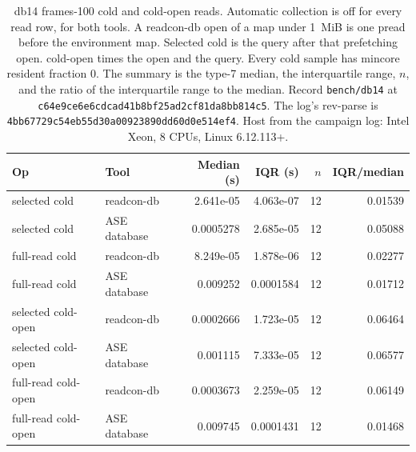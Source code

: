 \begin{table}[tbp]
\centering
\scriptsize
\caption{db14 frames-100 cold and cold-open reads.
Automatic collection is off for every read row, for both tools.
A readcon-db open of a map under 1~MiB is one pread before the environment map.
Selected cold is the query after that prefetching open.
cold-open times the open and the query.
Every cold sample has mincore resident fraction 0.
The summary is the type-7 median, the interquartile range, $n$, and the ratio of the interquartile range to the median.
Record \texttt{bench/db14} at \texttt{c64e9ce6e6cdcad41b8bf25ad2cf81da8bb814c5}.
The log's rev-parse is \texttt{4bb67729c54eb55d30a00923890dd60d0e514ef4}.
Host from the campaign log: Intel Xeon, 8 CPUs, Linux 6.12.113+.}
\label{tab:db14}
\begin{tabular}{@{}llrrrr@{}}
\toprule
Op & Tool & Median (s) & IQR (s) & $n$ & IQR/median \\
\midrule
selected cold & readcon-db & 2.641e-05 & 4.063e-07 & 12 & 0.01539 \\
selected cold & ASE database & 0.0005278 & 2.685e-05 & 12 & 0.05088 \\
full-read cold & readcon-db & 8.249e-05 & 1.878e-06 & 12 & 0.02277 \\
full-read cold & ASE database & 0.009252 & 0.0001584 & 12 & 0.01712 \\
selected cold-open & readcon-db & 0.0002666 & 1.723e-05 & 12 & 0.06464 \\
selected cold-open & ASE database & 0.001115 & 7.333e-05 & 12 & 0.06577 \\
full-read cold-open & readcon-db & 0.0003673 & 2.259e-05 & 12 & 0.06149 \\
full-read cold-open & ASE database & 0.009745 & 0.0001431 & 12 & 0.01468 \\
\bottomrule
\end{tabular}
\end{table}
